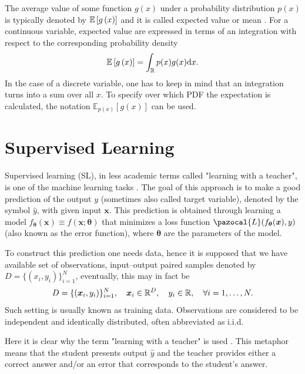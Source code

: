 The average value of some function $g(x)$ under a probability distribution $p(x)$ is typically denoted by $\mathbb{E}\left[ g\left(x\right) \right]$ and it is called expected value or mean \cite{bishop}. For a continuous variable, expected value are expressed in terms of an integration with respect to the corresponding probability density
\begin{equation}
	\mathbb{E}\left[ g\left(x\right) \right] = \int_{\mathbb{R}} p(x)g(x)\mathrm{d}{x}.
\end{equation} 
In the case of a discrete variable, one has to keep in mind that an integration turns into a sum over all $x$. To specify over which PDF the expectation is calculated, the notation $\mathbb{E}_{p(x)}\left[g\left(x\right)\right]$ can be used.

\section{Supervised Learning}
Supervised learning (SL), in less academic terms called "learning with a teacher", is one of the machine learning tasks  \cite{supervised}.  The goal of this approach is to make a good prediction of the output $y$ (sometimes also called target variable), denoted by the symbol $\hat{y}$, with given input $\boldsymbol{x}$. This prediction is obtained through learning a model $f_{\boldsymbol{\theta}}\left(\boldsymbol{x}\right)\equiv f\left(\boldsymbol{x}; \boldsymbol{\theta}\right)$ that minimizes a loss function  $\pazocal{L}(f_{\boldsymbol{\theta}}(\boldsymbol{x}), y)$ (also known as the error function), where $\boldsymbol{\theta}$ are the parameters of the model. 

To construct this prediction one needs data, hence it is supposed that we have available set of observations, input--output paired samples denoted by $D = \lbrace \left(x_i , y_i \right)\rbrace_{i=1}^N$, eventually, this may in fact be 
\begin{equation}
D = \lbrace\left( \boldsymbol{x}_i , y_i \right)\rbrace_{i=1}^N,\quad \boldsymbol{x}_i \in \mathbb{R}^D,\quad y_i \in \mathbb{R},\quad\forall i = 1,\dots,N.
\end{equation}
Such setting is usually known as training data.  Observations are considered to be independent and identically distributed, often abbreviated as i.i.d. 

Here it is clear why the term "learning with a teacher" is used                                   . This metaphor means that the student presents output $\widehat{y}$ and the teacher provides either a correct answer and/or an error that corresponds to the student's answer. 

